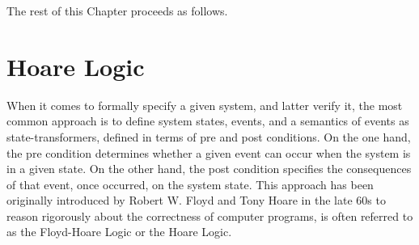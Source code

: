 The rest of this Chapter proceeds as follows.
%

\section{Hoare Logic} %

When it comes to formally specify a given system, and latter verify it, the most
common approach is to define system states, events, and a semantics of events as
state-transformers, defined in terms of pre and post conditions.
%
On the one hand, the pre condition determines whether a given event can occur
when the system is in a given state.
%
On the other hand, the post condition specifies the consequences of that event,
once occurred, on the system state.
%
This approach has been originally introduced by Robert W. Floyd and Tony Hoare
in the late 60s to reason rigorously about the correctness of computer programs,
is often referred to as the Floyd-Hoare Logic or the Hoare Logic.

